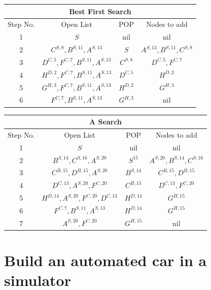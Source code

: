 \documentclass[12pt, letterpaper]{article}
\begin{document}
\begin{center}
    \begin{tabular}{|c|c|c|c|}
    \hline
    \multicolumn{4}{|c|}{Best First Search}\\
    \hline
    Step No. & Open List & POP & Nodes to add \\ 
    \hline
    1 & $S$ & nil & nil \\
    \hline
    2 & $C^{S,8}, B^{S,11}, A^{S,13}$ & $S$ & $A^{S,13}, B^{S,11}, C^{S,8}$ \\
    \hline
    3 & $D^{C,5}, F^{C,7}, B^{S,11}, A^{S,13}$ & $C^{S,8}$ & $D^{C,5}, F^{C,7}$ \\
    \hline
    4 & $H^{D,2}, F^{C,7}, B^{S,11}, A^{S,13}$ & $D^{C,5}$ & $H^{D,2}$\\
    \hline
    5 & $G^{H,3}, F^{C,7}, B^{S,11}, A^{S,13}$ & $H^{D,2}$ & $G^{H,3}$\\
    \hline
    6 & $F^{C,7}, B^{S,11}, A^{S,13}$ & $G^{H,3}$ & nil\\
    \hline
    \end{tabular}
\end{center}

\begin{center}
    \begin{tabular}{|c|c|c|c|}
    \hline
    \multicolumn{4}{|c|}{A\* Search}\\
    \hline
    Step No. & Open List & POP & Nodes to add \\ 
    \hline
    1 & $S$ & nil & nil \\
    \hline
    2 & $B^{S,14}, C^{S,16},A^{S,20}$ & $S^{15}$ & $A^{S,20}, B^{S,14}, C^{S,16}$ \\
    \hline
    3 & $C^{B,15}, D^{B,15}, A^{S,20}$ & $B^{S,14}$ & $C^{B,15}, D^{B,15}$ \\
    \hline
    4 & $D^{C,13}, A^{S,20}, F^{C,20}$ & $C^{B,15}$ & $D^{C,13},F^{C,20}$\\
    \hline
    5 & $H^{D,14}, A^{S,20}, F^{C,20}, D^{C,13}$ & $H^{D,14}$ & $G^{H,15}$\\
    \hline
    6 & $F^{C,7}, B^{S,11}, A^{S,13}$ & $H^{D,14}$ & $G^{H,15}$\\
    \hline
    7 & $A^{S,20}, F^{C,20}$ & $G^{H,15}$ & nil\\
    \hline
    \end{tabular}
\end{center}

\section{Build an automated car in a simulator}
\end{document}
